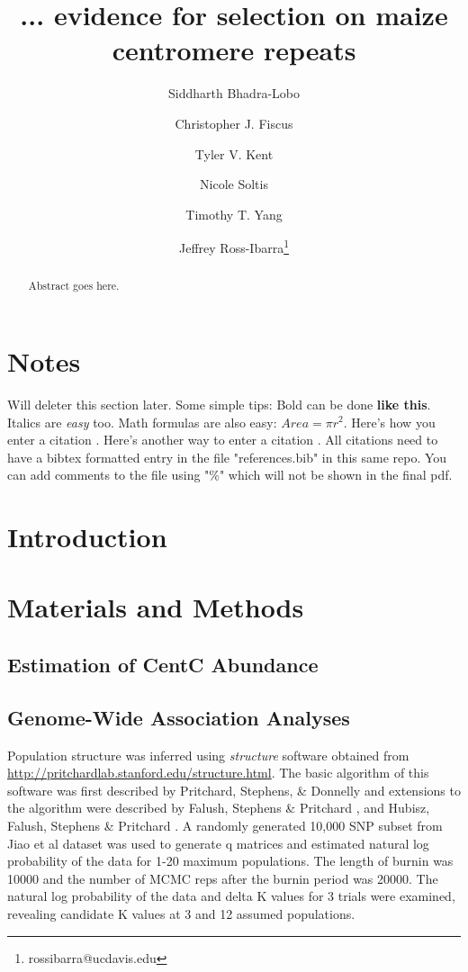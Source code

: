 \documentclass[12pt]{article}
\title{... evidence for selection on maize centromere repeats}
\author[1]{Siddharth Bhadra-Lobo}
\author[1]{Christopher J. Fiscus}
\author[1]{Tyler V. Kent}
\author[1]{Nicole Soltis}
\author[1]{Timothy T. Yang}
\author[1,2]{Jeffrey Ross-Ibarra\thanks{rossibarra@ucdavis.edu}}
\affil[1]{Department of Plant Sciences, University of California Davis}
\affil[2]{Center for Population Biology and Genome Center, University of California Davis}
\date{}
\begin{document}
\maketitle

\begin{abstract}
Abstract goes here.
\end{abstract}

\begin{footnotesize}
\end{footnotesize}

\section*{Notes}

Will deleter this section later.  Some simple tips:
Bold can be done {\bf like this}.  Italics are \emph{easy} too.  Math formulas are also easy: $Area=\pi r^2$.
Here's how you enter a citation \cite{Wolfgruber2009}.
Here's another way to enter a citation \citep{Wolfgruber2009}.
All citations need to have a bibtex formatted entry in the file "references.bib" in this same repo. You can add comments to the file using "\%" which will not be shown in the final pdf.  

\section{Introduction}

\section{Materials and Methods}

\subsection{Estimation of CentC Abundance} %

\subsection{Genome-Wide Association Analyses} %
Population structure was inferred using \emph{structure} software obtained from \url{http://pritchardlab.stanford.edu/structure.html}.  The basic algorithm of this software was first described by Pritchard, Stephens, \& Donnelly \cite{Pritchard2000} and extensions to the algorithm were described by Falush, Stephens \& Pritchard \cite{Falush2003}, \cite{Falush2007} and Hubisz, Falush, Stephens \& Pritchard \cite{Hubisz2009}. A randomly generated 10,000 SNP subset from Jiao et al dataset was used to generate q matrices and estimated natural log probability of the data for 1-20 maximum populations.  The length of burnin was 10000 and the number of MCMC reps after the burnin period was 20000.  The natural log probability of the data and delta K values for 3 trials were examined, revealing candidate K values at 3 and 12 assumed populations.    
\end{document}
